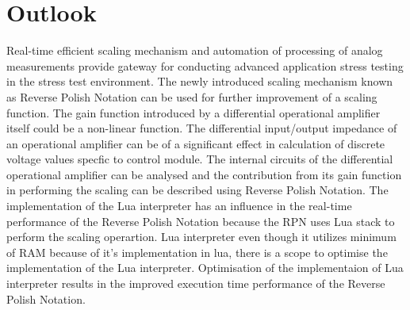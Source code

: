 \chapter{Outlook}
Real-time efficient scaling mechanism and automation of processing of analog measurements provide gateway for conducting advanced application stress testing in the stress test environment.
The newly introduced scaling mechanism known as Reverse Polish Notation can be used for further improvement of a scaling function. The gain function introduced by a 
differential operational amplifier itself could be a non-linear function. The differential input/output impedance of an operational amplifier can be of a significant effect 
in calculation of discrete voltage values specfic to control module. The internal circuits of the differential operational amplifier can be analysed and the
contribution from its gain function in performing the scaling can be described using Reverse Polish Notation. The implementation of the Lua interpreter has an influence in the real-time performance of the Reverse Polish Notation because the RPN uses Lua stack to perform the scaling operartion. Lua interpreter even though it utilizes minimum of RAM because of it's implementation in lua, there is a scope to optimise the implementation of the Lua interpreter. Optimisation of the implementaion of Lua interpreter results in the improved execution time performance of the Reverse Polish Notation.    
 
